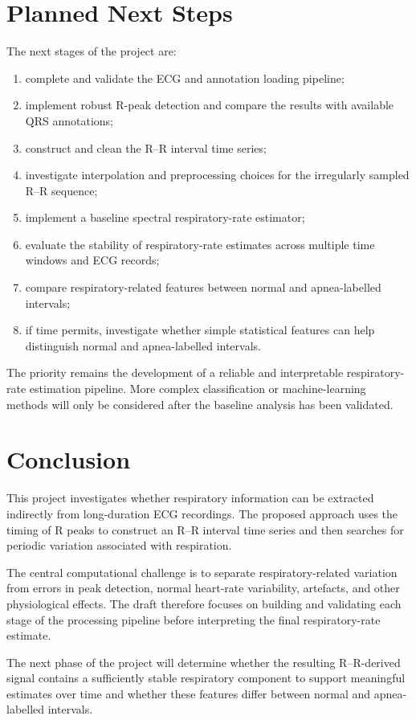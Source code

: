 \section{Planned Next Steps}
\label{sec:next_steps}

The next stages of the project are:

\begin{enumerate}
    \item complete and validate the ECG and annotation loading pipeline;

    \item implement robust R-peak detection and compare the results with
    available QRS annotations;

    \item construct and clean the R--R interval time series;

    \item investigate interpolation and preprocessing choices for the
    irregularly sampled R--R sequence;

    \item implement a baseline spectral respiratory-rate estimator;

    \item evaluate the stability of respiratory-rate estimates across
    multiple time windows and ECG records;

    \item compare respiratory-related features between normal and
    apnea-labelled intervals;

    \item if time permits, investigate whether simple statistical features
    can help distinguish normal and apnea-labelled intervals.
\end{enumerate}

The priority remains the development of a reliable and interpretable
respiratory-rate estimation pipeline. More complex classification or
machine-learning methods will only be considered after the baseline analysis
has been validated.


\section{Conclusion}
\label{sec:conclusion}

This project investigates whether respiratory information can be extracted
indirectly from long-duration ECG recordings. The proposed approach uses the
timing of R peaks to construct an R--R interval time series and then searches
for periodic variation associated with respiration.

The central computational challenge is to separate respiratory-related
variation from errors in peak detection, normal heart-rate variability,
artefacts, and other physiological effects. The draft therefore focuses on
building and validating each stage of the processing pipeline before
interpreting the final respiratory-rate estimate.

The next phase of the project will determine whether the resulting
R--R-derived signal contains a sufficiently stable respiratory component to
support meaningful estimates over time and whether these features differ
between normal and apnea-labelled intervals.
